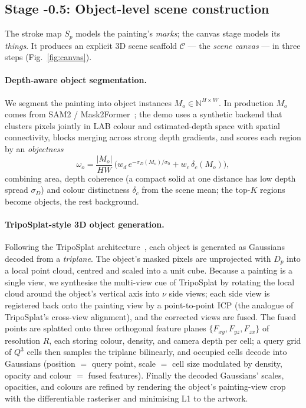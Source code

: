 \documentclass[10pt,twocolumn,letterpaper]{article}
\begin{document}
\subsection{Stage -0.5: Object-level scene construction}
\label{sec:stage-object}

The stroke map $S_p$ models the painting's \emph{marks}; the canvas stage
models its \emph{things}. It produces an explicit 3D scene scaffold
$\mathcal{C}$ --- the \emph{scene canvas} --- in three steps
(Fig.~\ref{fig:canvas}).

\paragraph{Depth-aware object segmentation.}
We segment the painting into object instances $M_o \in
\mathbb{N}^{H\times W}$. In production $M_o$ comes from SAM2 /
Mask2Former~\cite{sam2,mask2former}; the demo uses a synthetic backend that
clusters pixels jointly in LAB colour and estimated-depth space with spatial
connectivity, blocks merging across strong depth gradients, and scores each
region by an \emph{objectness}
\begin{equation}
\omega_o = \frac{|M_o|}{HW}\,
\big(w_d\, e^{-\sigma_D(M_o)/\sigma_0} + w_c\, \delta_c(M_o)\big),
\end{equation}
combining area, depth coherence (a compact solid at one distance has low
depth spread $\sigma_D$) and colour distinctness $\delta_c$ from the scene
mean; the top-$K$ regions become objects, the rest background.

\paragraph{TripoSplat-style 3D object generation.}
Following the TripoSplat architecture~\cite{triposplat2025}, each object is
generated as Gaussians decoded from a \emph{triplane}. The object's masked
pixels are unprojected with $D_p$ into a local point cloud, centred and
scaled into a unit cube. Because a painting is a single view, we synthesise
the multi-view cue of TripoSplat by rotating the local cloud around the
object's vertical axis into $\nu$ side views; each side view is registered
back onto the painting view by a point-to-point ICP (the analogue of
TripoSplat's cross-view alignment), and the corrected views are fused. The
fused points are splatted onto three orthogonal feature planes
$\{F_{xy}, F_{yz}, F_{zx}\}$ of resolution $R$, each storing colour, density,
and camera depth per cell; a query grid of $Q^3$ cells then samples the
triplane bilinearly, and occupied cells decode into Gaussians
(position $=$ query point, scale $=$ cell size modulated by density, opacity
and colour $=$ fused features). Finally the decoded Gaussians' scales,
opacities, and colours are refined by rendering the object's painting-view
crop with the differentiable rasteriser and minimising L1 to the artwork.
\end{document}
